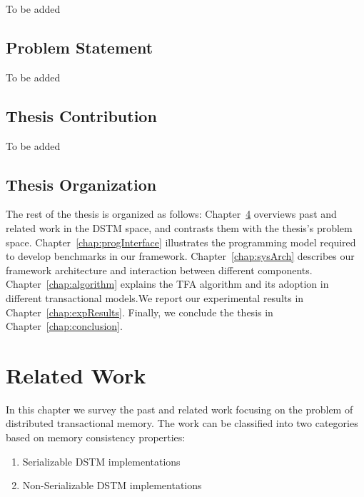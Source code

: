 \documentclass[12pt,english]{report}
\begin{document}
To be added

\section{Problem Statement}

To be added

\section{Thesis Contribution}

To be added

\section{Thesis Organization}

The rest of the thesis is organized as follows: Chapter~\ref{chap:relWork} overviews past and related work in the DSTM space, and contrasts them with the thesis's problem space. Chapter~\ref{chap:progInterface} illustrates the programming model required to develop benchmarks in our framework. Chapter~\ref{chap:sysArch} describes our framework architecture and interaction between different components. Chapter~\ref{chap:algorithm} explains the TFA algorithm and its adoption in different transactional models.We report our experimental results in Chapter~\ref{chap:expResults}. Finally, we conclude the thesis in Chapter~\ref{chap:conclusion}.

\chapter{Related Work}\label{chap:relWork}

In this chapter we survey the past and related work focusing on the problem of distributed transactional memory. The work can be classified into two categories based on memory consistency properties:

\begin{enumerate}
\item Serializable DSTM implementations
\item Non-Serializable DSTM implementations 
\end{enumerate}
\end{document}
